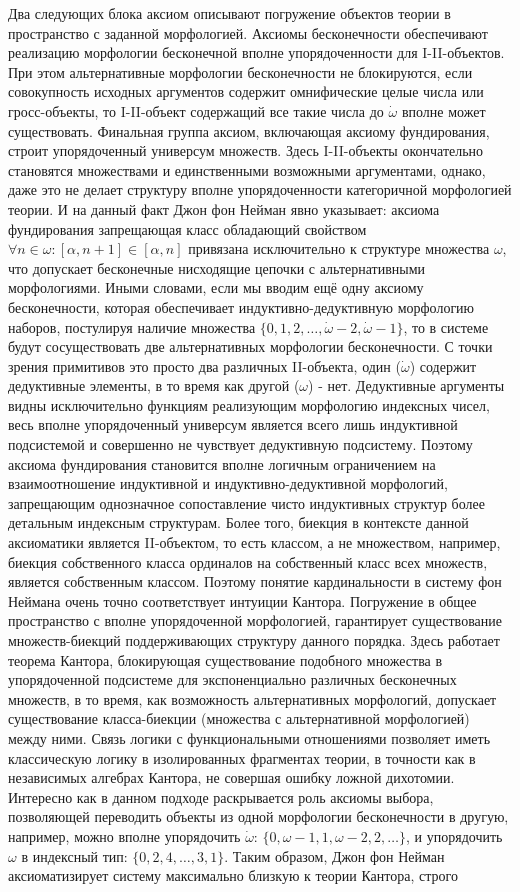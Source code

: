 \documentclass[12pt]{article}
\begin{document}
Два следующих блока аксиом описывают погружение объектов теории в пространство с заданной морфологией. Аксиомы бесконечности обеспечивают реализацию морфологии бесконечной вполне упорядоченности для I-II-объектов. При этом альтернативные морфологии бесконечности не блокируются, если совокупность исходных аргументов содержит омнифические целые числа или гросс-объекты, то I-II-объект содержащий все такие числа до $\dot{\omega}$ вполне может существовать. Финальная группа аксиом, включающая аксиому фундирования, строит упорядоченный универсум множеств. Здесь I-II-объекты окончательно становятся множествами и единственными возможными аргументами, однако, даже это не делает структуру вполне упорядоченности категоричной морфологией теории. И на данный факт Джон фон Нейман явно указывает: аксиома фундирования запрещающая класс обладающий свойством $\forall n \in \omega: [\alpha, n + 1] \in [\alpha, n]$ привязана исключительно к структуре множества $\omega$, что допускает бесконечные нисходящие цепочки с альтернативными морфологиями. Иными словами, если мы вводим ещё одну аксиому бесконечности, которая обеспечивает индуктивно-дедуктивную морфологию наборов, постулируя наличие множества $\{ 0, 1, 2, \dots, \dot{\omega} - 2, \dot{\omega} - 1 \}$, то в системе будут сосуществовать две альтернативных морфологии бесконечности. С точки зрения примитивов это просто два различных II-объекта, один ($\dot{\omega}$) содержит дедуктивные элементы, в то время как другой ($\omega$) - нет. Дедуктивные аргументы видны исключительно функциям реализующим морфологию индексных чисел, весь вполне упорядоченный универсум является всего лишь индуктивной подсистемой и совершенно не чувствует дедуктивную подсистему. Поэтому аксиома фундирования становится вполне логичным ограничением на взаимоотношение индуктивной и индуктивно-дедуктивной морфологий, запрещающим однозначное сопоставление чисто индуктивных структур более детальным индексным структурам. Более того, биекция в контексте данной аксиоматики является II-объектом, то есть классом, а не множеством, например, биекция собственного класса ординалов на собственный класс всех множеств, является собственным классом. Поэтому понятие кардинальности в систему фон Неймана очень точно соответствует интуиции Кантора. Погружение в общее пространство с вполне упорядоченной морфологией, гарантирует существование множеств-биекций поддерживающих структуру данного порядка. Здесь работает теорема Кантора, блокирующая существование подобного множества в упорядоченной подсистеме для экспоненциально различных бесконечных множеств, в то время, как возможность альтернативных морфологий, допускает существование класса-биекции (множества с альтернативной морфологией) между ними. Связь логики с функциональными отношениями позволяет иметь классическую логику в изолированных фрагментах теории, в точности как в независимых алгебрах Кантора, не совершая ошибку ложной дихотомии. Интересно как в данном подходе раскрывается роль аксиомы выбора, позволяющей переводить объекты из одной морфологии бесконечности в другую, например, можно вполне упорядочить $\dot{\omega}$: $\{ 0, \omega - 1, 1, \omega - 2, 2, \dots \}$, и упорядочить $\omega$ в индексный тип: $\{ 0, 2, 4, \dots, 3, 1 \}$. Таким образом, Джон фон Нейман аксиоматизирует систему максимально близкую к теории Кантора, строго 
\end{document}
